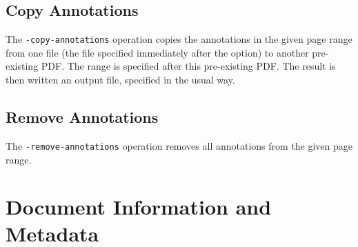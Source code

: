 \documentclass{book}
\begin{document}
  \section{Copy Annotations}
  The \texttt{-copy-annotations} operation copies the annotations in the given
page range from one file (the file specified immediately after the option) to
another pre-existing PDF. The range is specified after this pre-existing PDF.
The result is then written an output file, specified in the usual way.
\noindent{}

  \section{Remove Annotations}
  The \texttt{-remove-annotations} operation removes all annotations from the
given page range.

\noindent{}


\chapter{Document Information and Metadata}
\end{document}
